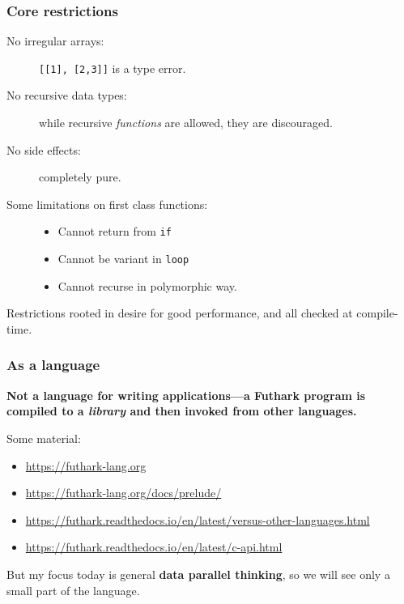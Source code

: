 \begin{frame}
  \frametitle{Core restrictions}

  \begin{description}
  \item[No irregular arrays:]
    \texttt{[[1], [2,3]]} is a type error.\pause
  \item[No recursive data types:] while recursive \emph{functions} are allowed,
    they are discouraged.\pause
  \item[No side effects:] completely pure.\pause
  \item[Some limitations on first class functions:]\hfill
    \begin{itemize}
    \item Cannot return from \texttt{if}
    \item Cannot be variant in \texttt{loop}
    \item Cannot recurse in polymorphic way.
    \end{itemize}
  \end{description}

  \begin{center}
    Restrictions rooted in desire for good performance, and all checked at
    compile-time.
  \end{center}
\end{frame}

\begin{frame}
  \frametitle{As a language}

  \begin{center}
    \textbf{Not a language for writing applications---a Futhark program is
      compiled to a \emph{library} and then invoked from other languages.}
  \end{center}

  Some material:

  \begin{itemize}
  \item \url{https://futhark-lang.org}
  \item \url{https://futhark-lang.org/docs/prelude/}
  \item \url{https://futhark.readthedocs.io/en/latest/versus-other-languages.html}
  \item \url{https://futhark.readthedocs.io/en/latest/c-api.html}
  \end{itemize}

  But my focus today is general \textbf{data parallel thinking}, so we will see
  only a small part of the language.

\end{frame}

